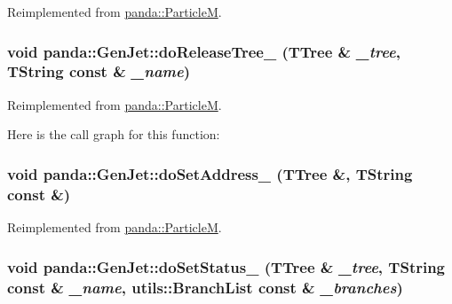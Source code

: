 Reimplemented from \hyperlink{classpanda_1_1ParticleM_ae912914e3970c1fb238589f0ccc783f4}{panda::ParticleM}.\hypertarget{classpanda_1_1GenJet_a9a787148306f5a612be76c57fbcf0317}{
\subsubsection[{doReleaseTree\_\-}]{\setlength{\rightskip}{0pt plus 5cm}void panda::GenJet::doReleaseTree\_\- (TTree \& {\em \_\-tree}, \/  TString const \& {\em \_\-name})}}
\label{classpanda_1_1GenJet_a9a787148306f5a612be76c57fbcf0317}


Reimplemented from \hyperlink{classpanda_1_1ParticleM_a0c24df56cbd50a8223fc4d8bf0b776d0}{panda::ParticleM}.

Here is the call graph for this function:\hypertarget{classpanda_1_1GenJet_ac0e79d0ee45b00c8477d376f81008204}{
\subsubsection[{doSetAddress\_\-}]{\setlength{\rightskip}{0pt plus 5cm}void panda::GenJet::doSetAddress\_\- (TTree \&, \/  TString const \&)}}
\label{classpanda_1_1GenJet_ac0e79d0ee45b00c8477d376f81008204}


Reimplemented from \hyperlink{classpanda_1_1ParticleM_ab54d46a237f8d12074ee36c48af33b04}{panda::ParticleM}.\hypertarget{classpanda_1_1GenJet_a519508188c474ac1dcc2c822de9e43c3}{
\subsubsection[{doSetStatus\_\-}]{\setlength{\rightskip}{0pt plus 5cm}void panda::GenJet::doSetStatus\_\- (TTree \& {\em \_\-tree}, \/  TString const \& {\em \_\-name}, \/  {\bf utils::BranchList} const \& {\em \_\-branches})}}
\label{classpanda_1_1GenJet_a519508188c474ac1dcc2c822de9e43c3}


